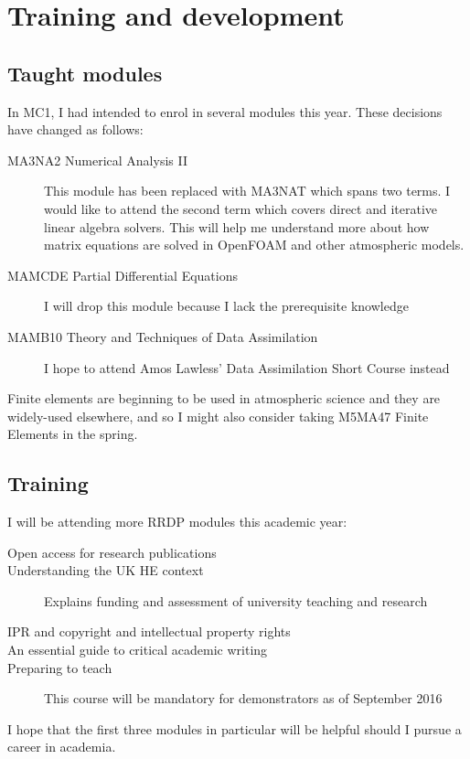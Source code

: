 \documentclass[a4paper]{article}
\begin{document}
\section{Training and development}

\subsection*{Taught modules}
In MC1, I had intended to enrol in several modules this year.  These decisions have changed as follows:
\begin{description}
\item[MA3NA2 Numerical Analysis II]{This module has been replaced with MA3NAT which spans two terms.  I would like to attend the second term which covers direct and iterative linear algebra solvers.  This will help me understand more about how matrix equations are solved in OpenFOAM and other atmospheric models.}
\item[MAMCDE Partial Differential Equations]{I will drop this module because I lack the prerequisite knowledge}
\item[MAMB10 Theory and Techniques of Data Assimilation]{I hope to attend Amos Lawless' Data Assimilation Short Course instead}
\end{description}
Finite elements are beginning to be used in atmospheric science and they are widely-used elsewhere, and so I might also consider taking M5MA47 Finite Elements in the spring.

\subsection*{Training}
I will be attending more RRDP modules this academic year:
\begin{description}
	\item[Open access for research publications]{}
	\item[Understanding the UK HE context]{Explains funding and assessment of university teaching and research}
	\item[IPR and copyright and intellectual property rights]{}
	\item[An essential guide to critical academic writing]{}
	\item[Preparing to teach]{This course will be mandatory for demonstrators as of September 2016}
\end{description}
I hope that the first three modules in particular will be helpful should I pursue a career in academia.
\end{document}
